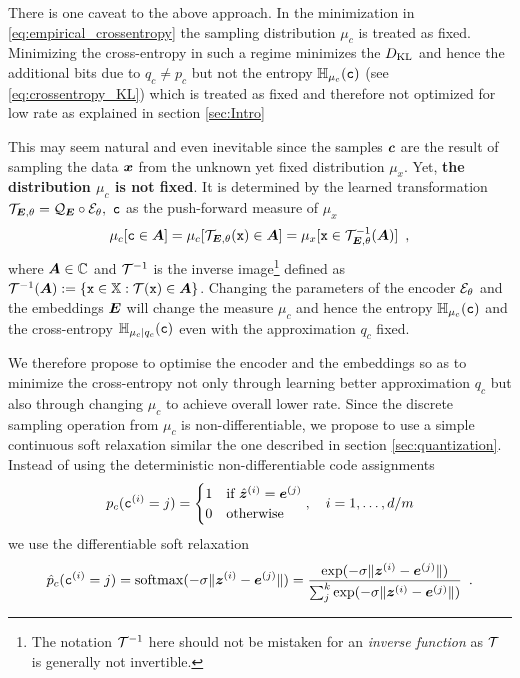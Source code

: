 \documentclass{article} %
\renewcommand{\rvx}{\mathtt{x}}
\renewcommand{\rvc}{\mathtt{c}}
\newcommand{\pc}{p_c}
\newcommand{\qc}{q_c}
\newcommand{\muc}{\mu_c}
\newcommand{\Hc}{\sH_{\muc}}
\newcommand{\cHc}{\sH_{\muc|\qc}}
\newcommand{\gEt}{\gE_\theta}
\newcommand{\gQE}{\gQ_\mE}
\newcommand{\gTEt}{\gT_{\mE, \theta}}
\newcommand{\vzh}{\hat{\vz}}
\begin{document}
There is one caveat to the above approach.
In the minimization in \eqref{eq:empirical_crossentropy} the sampling  distribution $\mu_c$ is treated as fixed.
Minimizing the cross-entropy in such a regime minimizes the $D_{\mathrm{KL}}$ and hence the additional bits due to $\qc \neq \pc$ but not the entropy $\Hc(\rvc)$ (see \eqref{eq:crossentropy_KL}) which is treated as fixed and therefore not optimized for low rate as explained in section \ref{sec:Intro}

This may seem natural and even inevitable since the samples ${\bm{c}}$ are the result of sampling the data ${\bm{x}}$ from the unknown yet fixed distribution $\mu_x$.
Yet, \textbf{the distribution $\mu_c$ is not fixed}.
It is determined by the learned transformation $\gTEt = \gQE \circ \gEt, \ \rvc$ as the push-forward measure of $\mu_x$
\begin{align}
\mu_c[\rvc \in \mA] = \mu_c[\gTEt(\rvx) \in \mA] = \mu_x[\rvx \in \gTEt^{-1}(\mA)] \enspace ,
\end{align}
where ${\bm{A}} \in {\mathbb{C}}$ and ${\mathcal{T}}^{-1}$ is the inverse image\footnote{The notation ${\mathcal{T}}^{-1}$ here should not be mistaken for an \emph{inverse function} as ${\mathcal{T}}$ is generally not invertible.} defined as $\gT^{-1}(\mA) := \{\rvx \in \sX : \gT(\rvx) \in \mA\}$.
Changing the parameters of the encoder $\gEt$ and the embeddings ${\bm{E}}$ will change the measure $\mu_c$ and hence the entropy $\Hc(\rvc)$ and the cross-entropy $\cHc(\rvc)$ even with the approximation $\qc$ fixed.

We therefore propose to optimise the encoder and the embeddings so as to minimize the cross-entropy not only through learning better approximation $\qc$ but also through changing $\mu_c$ to achieve overall lower rate.
Since the discrete sampling operation from $\mu_c$ is non-differentiable, we propose to use a simple continuous soft relaxation similar the one described in section \ref{sec:quantization}.
Instead of using the deterministic non-differentiable code assignments
\begin{align}\label{eq:hardprobs}
\pc(\rvc^{(i)} = j) =
\begin{cases}
1 & \text{if} \ \vzh^{(i)} = \ve^{(j)} \\
0 & \text{otherwise}
\end{cases},
\quad i = 1, \ldots, d/m
\end{align}
we use the differentiable soft relaxation
\begin{align}\label{eq:softprobs}
\hat{p}_c(\rvc^{(i)} = j) = \softmax(-\sigma \Vert \vz^{(i)} - \ve^{(j)} \Vert) = \frac{\exp(-\sigma \Vert \vz^{(i)} - \ve^{(j)} \Vert)}{\sum_j^k \exp(-\sigma \Vert \vz^{(i)} - \ve^{(j)} \Vert)} \enspace .
\end{align}
\end{document}
